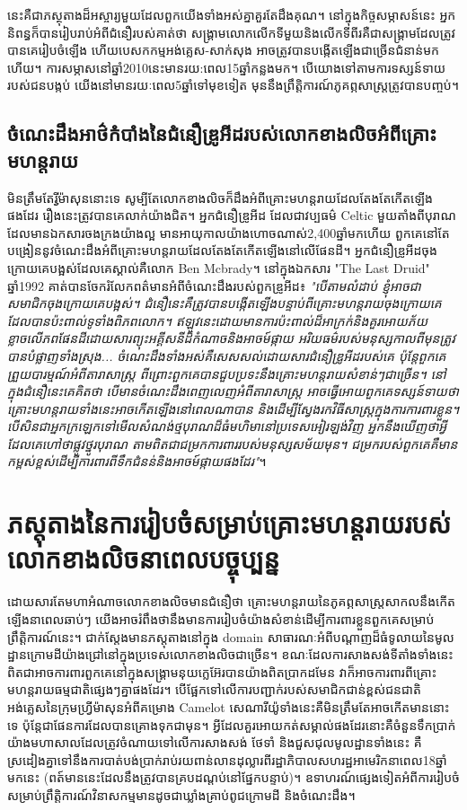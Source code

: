 \documentclass[10pt,twocolumn,letterpaper]{article}
\begin{document}
	នេះគឺជាភស្ថុតាងដ៏អស្ចារ្យមួយដែលពួកយើងទាំងអស់គ្នាគួរតែដឹងគុណ។ នៅក្នុងកិច្ចសម្ភាសន៍នេះ អ្នកនិពន្ធក៏បានរៀបរាប់អំពីជំនឿរបស់គាត់ថា សង្គ្រាមលោកលើកទីមួយនិងលើកទីពីរគឺជាសង្គ្រាមដែលត្រូវបានគេរៀបចំឡើង ហើយបេសកកម្មអង់គ្លេស-សាក់សុង អាចត្រូវបានបង្កើតឡើងជាច្រើនជំនាន់មកហើយ។ ការសម្ភាសនៅឆ្នាំ2010នេះមានរយ:ពេល15ឆ្នាំកន្លងមក។ បើយោងទៅតាមការទស្សន៍ទាយរបស់ជនបង្កប់ យើងនៅមានរយៈពេល5ឆ្នាំទៅមុខទៀត មុននឹងព្រឹត្តិការណ៍ភូគព្ភសាស្ត្រត្រូវបានបញ្ចប់។
\subsection{ចំណេះដឹងអាថ៌កំបាំងនៃជំនឿឌ្រូអីដរបស់លោកខាងលិចអំពីគ្រោះមហន្តរាយ}

	មិនត្រឹមតែរ្វីម៉ាសុននោះទេ សូម្បីតែលោកខាងលិចក៏ដឹងអំពីគ្រោះមហន្តរាយដែលតែងតែកើតឡើងផងដែរ រឿងនេះត្រូវបានគេលាក់យ៉ាងជិត។ អ្នកជំនឿឌ្រូអីដ ដែលជាវប្បធម៌ Celtic មួយតាំងពីបុរាណដែលមានឯកសារចងក្រងយ៉ាងល្អ មានអាយុកាលយ៉ាងហោចណាស់2,400ឆ្នាំមកហើយ\cite{7} ពួកគេនៅតែបង្រៀននូវចំណេះដឹងអំពីគ្រោះមហន្តរាយដែលតែងតែកើតឡើងនៅលើផែនដី។ អ្នកជំនឿឌ្រូអីដចុងក្រោយគេបង្អស់ដែលគេស្គាល់គឺលោក Ben Mcbrady។ នៅក្នុងឯកសារ "The Last Druid" ឆ្នាំ1992 គាត់បានចែករំលែកពត៌មានអំពីចំណេះដឹងរបស់ពួកឌ្រូអីដ៖ \textit{"បើតាមលំដាប់ ខ្ញុំអាចជាសមាជិកចុងក្រោយគេបង្អស់។ ជំនឿនេះគឺត្រូវបានបង្កើតឡើងបន្ទាប់ពីគ្រោះមហន្តរាយចុងក្រោយគេដែលបានប៉ះពាល់ទូទាំងពិភពលោក។ ឥឡូវនេះដោយមានការប៉ះពាល់ដ៏អាក្រក់​និងគួរអោយភ័យខ្លាចលើភពផែនដីដោយសារព្យុះអគ្គីសនីដ៏កំណាចនិងអាចម៍ផ្កាយ អរិយធម៌របស់មនុស្សកាលពីមុនត្រូវបានបំផ្លាញទាំងស្រុង... ចំណេះដឹងទាំងអស់គឺសេសសល់ដោយសារជំនឿឌ្រូអីដរបស់គេ ប៉ុន្តែពួកគេព្រួយបារម្មណ៍អំពីតារាសាស្ត្រ ពីព្រោះពួកគេបានជួបប្រទះនឹងគ្រោះមហន្តរាយសំខាន់ៗជាច្រើន។ នៅក្នុងជំនឿនេះ​គេគិតថា បើមានចំណេះដឹងពេញលេញអំពីតារាសាស្ត្រ អាចធ្វើអោយពួកគេទស្សន៍ទាយថាគ្រោះមហន្តរាយទាំងនេះអាចកើតឡើងនៅពេលណាបាន និងដើម្បីស្វែងរកវិធីសាស្ត្រក្នុងការការពារខ្លួន។ បើសិនជាអ្នកក្រឡេកទៅមើលសំណង់ថ្មបុរាណដ៏ធំមហិមានៅប្រទេសអៀរឡង់វិញ អ្នកនឹងឃើញថាអ្វីដែលគេហៅថាផ្លូវថ្នូរបុរាណ តាមពិតជាជម្រកការពាររបស់មនុស្សសម័យមុន។ ជម្រករបស់ពួកគេគឺមានកម្ពស់ខ្ពស់ដើម្បីការពារពីទឹកជំនន់និងអាចម៍ផ្កាយផងដែរ"}\cite{8,9}។

\section{ភស្តុតាងនៃការរៀបចំសម្រាប់គ្រោះមហន្តរាយរបស់លោកខាងលិចនាពេលបច្ចុប្បន្ន}

	ដោយសារតែមហាអំណាចលោកខាងលិចមានជំនឿថា គ្រោះមហន្តរាយនៃភូគព្ភសាស្ត្រសាកលនឹងកើតឡើងនាពេលឆាប់ៗ យើងអាចរំពឹងថានឹងមានការរៀបចំយ៉ាងសំខាន់ដើម្បីការពារខ្លួនពួកគេសម្រាប់ព្រឹត្តិការណ៍នេះ។  ជាក់ស្តែងមានភស្តុតាងនៅក្នុង domain សាធារណៈអំពីបណ្តាញដ៏ធំទូលាយនៃមូលដ្ឋានក្រោមដីយ៉ាងជ្រៅនៅក្នុងប្រទេសលោកខាងលិចជាច្រើន។ ខណៈដែលការសាងសង់ទីតាំងទាំងនេះពិតជាអាចការពារពួកគេនៅក្នុងសង្គ្រាមនុយក្លេអ៊ែរបានយ៉ាងពិតប្រាកដមែន វាក៏អាចការពារពីគ្រោះមហន្តរាយធម្មជាតិផ្សេងៗគ្នាផងដែរ។ បើផ្អែកទៅលើការបញ្ជាក់របស់សមាជិកជាន់ខ្ពស់ជនជាតិអង់គ្លេសនៃ​ក្រុមហ្វ្រីម៉ាសុនអំពីគម្រោង Camelot\cite{4,6} សេណារីយ៉ូទាំងនេះគឺមិនត្រឹមតែអាចកើតមាននោះទេ​ ប៉ុន្តែជាផែនការដែលបានគ្រោងទុកជាមុន។ អ្វីដែលគួរអោយកត់សម្គាល់ផងដែរនោះ​គឺចំនួនទឹកប្រាក់យ៉ាងមហាសាលដែលត្រូវចំណាយទៅលើការសាងសង់ ថែទាំ និងជួសជុលមូលដ្ឋានទាំងនេះ គឺស្រដៀងគ្នាទៅនឹងការបាត់បង់ប្រាក់រាប់រយពាន់លានដុល្លារពីរដ្ឋាភិបាលសហរដ្ឋអាមេរិកនាពេល18ឆ្នាំមកនេះ (ពត៍មាននេះដែលនឹងត្រូវបានគ្របដណ្តប់នៅផ្នែកបន្ទាប់)\cite{11,12,13}។ ឧទាហរណ៍ផ្សេងទៀតអំពីការរៀបចំសម្រាប់ព្រឹត្តិការណ៍វិនាសកម្មមានដូចជាឃ្លាំងគ្រាប់ពូជក្រោមដី និងចំណេះដឹង។
\end{document}
